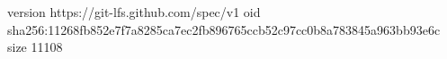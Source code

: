 version https://git-lfs.github.com/spec/v1
oid sha256:11268fb852e7f7a8285ca7ec2fb896765ccb52c97cc0b8a783845a963bb93e6c
size 11108
